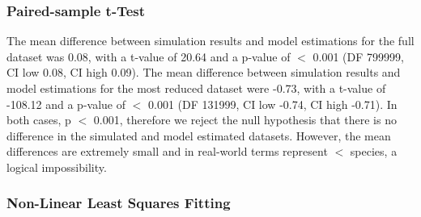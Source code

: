 \documentclass{article}
\begin{document}
\subsubsection{Paired-sample t-Test}

\begin{table}[h!]
\caption{Paired-sample t-test for simulation data and model estimations}
\centering
{}
   \end{table}\bigskip
   
\noindent The mean difference between simulation results and model estimations for the full dataset was 0.08, with a t-value of 20.64 and a p-value of $<$ 0.001 (DF 799999, CI low 0.08, CI high 0.09). The mean difference between simulation results and model estimations for the most reduced dataset were -0.73, with a t-value of -108.12 and a p-value of $<$ 0.001 (DF 131999, CI low -0.74, CI high -0.71). In both cases, p $<$ 0.001, therefore we reject the null hypothesis that there is no difference in the simulated and model estimated datasets. However, the mean differences are extremely small and in real-world terms represent $<$ species, a logical impossibility.  

\subsubsection{Non-Linear Least Squares Fitting}      
   
\end{document}
